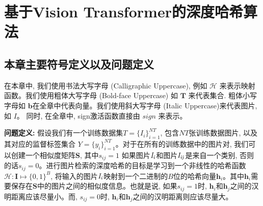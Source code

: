 \section{基于Vision Transformer的深度哈希算法}
\subsection{本章主要符号定义以及问题定义}
在本章中, 我们使用书法大写字母 (Calligraphic Uppercase), 例如 $\mathcal{H}$ 来表示映射函数。我们使用粗体大写字母 (Bold-face Uppercase) 如 $\mathbf{T}$ 来代表集合. 粗体小写字母如 $\mathbf{b}$在全章中代表向量。我们使用斜大写字母 (Italic Uppercase)来代表图片, 如 $\textit{I}$。 同时, 在全章中, sign激活函数直接由 $\textit{sign}$ 来表示。\par
\textbf{问题定义:} 假设我们有一个训练数据集$T = \{I_i\}_{i=1}^{NT}$, 包含$NT$张训练数据图片, 以及其对应的监督标签集合 $Y = \{y_i\}_{i=1}^{NT}$。对于在所有的训练数据中的图片对, 我们可以创建一个相似度矩阵$\mathbf{S}$, 其中$s_{ij} = 1$ 如果图片$\it{I}_i$和图片$\it{I}_{ij}$是来自一个类别, 否则的话$s_{ij} = 0$。进行图片检索的深度哈希的目标是学习到一个非线性的哈希函数$\mathcal{H}: \mathbf{I} \mapsto \{0,1\}^B $, 将输入的图片$\it{I}_i$映射到一个二进制的$B$位的哈希向量$\mathbf{h}_i$。其中$\mathbf{h}_i$需要保存在$\mathbf{S}$中的图片之间的相似度信息。也就是说, 如果$s_{ij} = 1$时, $\mathbf{h}_i$和$\mathbf{h}_j$之间的汉明距离应该尽量小。而, $s_{ij} = 0$时, $\mathbf{h}_i$和$\mathbf{h}_j$之间的汉明距离则应该尽量大。

